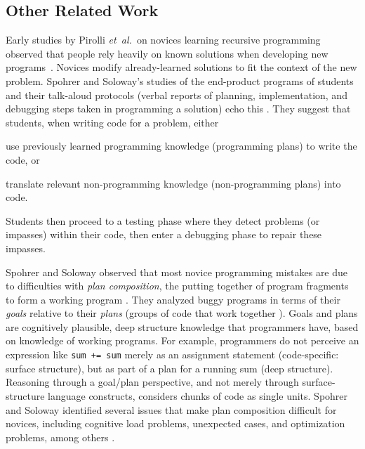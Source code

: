 \documentclass{sig-alternate-05-2015}
\newcommand{\etal}{\mbox{\it et al.\ }}
\begin{document}
\subsection{Other Related Work}
\label{sec:other-rel-work}

Early studies by Pirolli \etal on novices learning recursive programming observed that people rely heavily on known solutions when developing new programs~\cite{Pirolli_Anderson_1985,Pirolli_Anderson_Farrell_1984}.  Novices modify already-learned solutions to fit the context of the new problem. Spohrer and Soloway's studies of the end-product programs of students and their talk-aloud protocols (verbal reports of planning, implementation, and debugging steps taken in programming a solution) echo this \cite{Spohrer_Soloway_1989}. They suggest that students, when writing code for a problem, either 
\begin{inparaenum}[(1)]
	\item use previously learned programming knowledge (programming plans) to write the code, or 
	\item translate relevant non-programming knowledge (non-programming plans) into code.
\end{inparaenum}
Students then proceed to a testing phase where they detect problems (or impasses) within their code, then enter a debugging phase to repair these impasses.

Spohrer and Soloway observed that most novice programming mistakes are due to difficulties with \emph{plan composition}, the putting together of program fragments to form a working program \cite{Spohrer_Soloway_1986}. They analyzed buggy programs in terms of their \emph{goals} relative to their \emph{plans} (groups of code that work together \cite{Shneiderman_1976, Soloway_Ehrlich_1984}). Goals and plans are cognitively plausible, deep structure knowledge that programmers have, based on knowledge of working programs. For example, programmers do not perceive an expression like \lstinline{sum += sum} merely as an assignment statement (code-specific: surface structure), but as part of a plan for a running sum (deep structure). Reasoning through a goal/plan perspective, and not merely through surface-structure language constructs, considers chunks of code as single units.  Spohrer and Soloway identified several issues that make plan composition difficult for novices, including cognitive load problems, unexpected cases, and optimization problems, among others \cite{Spohrer_Soloway_1986}.

\end{document}
